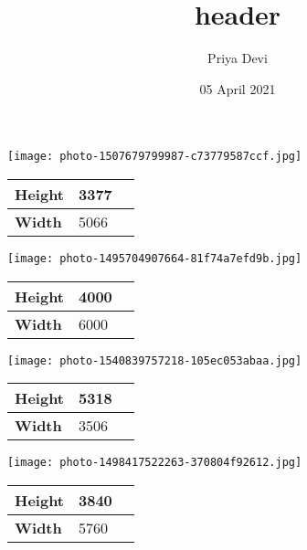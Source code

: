 \documentclass{article}
\title{header}
\author{Priya Devi}
\date{05 April 2021}
\begin{document}
\maketitle


\begin{center}
  \texttt{[image: photo-1507679799987-c73779587ccf.jpg]}

\begin{table}[ht]
\begin{tabular}{|M{6.8cm}|M{6.8cm}|N}
\hline
\textbf{Height} & 3377 &\\[20pt]
\hline
\textbf{Width} & 5066 &\\[20pt]
\hline
\end{tabular}
\end{table}


\end{center}

\begin{center}
  \texttt{[image: photo-1495704907664-81f74a7efd9b.jpg]}

\begin{table}[ht]
\begin{tabular}{|M{6.8cm}|M{6.8cm}|N}
\hline
\textbf{Height} & 4000 &\\[20pt]
\hline
\textbf{Width} & 6000 &\\[20pt]
\hline
\end{tabular}
\end{table}


\end{center}

\begin{center}
  \texttt{[image: photo-1540839757218-105ec053abaa.jpg]}

\begin{table}[ht]
\begin{tabular}{|M{6.8cm}|M{6.8cm}|N}
\hline
\textbf{Height} & 5318 &\\[20pt]
\hline
\textbf{Width} & 3506 &\\[20pt]
\hline
\end{tabular}
\end{table}


\end{center}

\begin{center}
  \texttt{[image: photo-1498417522263-370804f92612.jpg]}

\begin{table}[ht]
\begin{tabular}{|M{6.8cm}|M{6.8cm}|N}
\hline
\textbf{Height} & 3840 &\\[20pt]
\hline
\textbf{Width} & 5760 &\\[20pt]
\hline
\end{tabular}
\end{table}


\end{center}
\end{document}
